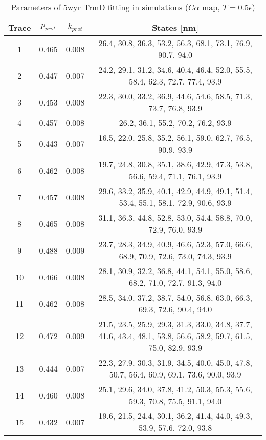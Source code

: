 \begin{table}
    \tiny
    \centering
    \caption{Parameters of 5wyr TrmD fitting in simulations ($C\alpha$ map, $T=0.5\epsilon$)}
    \label{tab:5wyr-ca-parameters}
    \begin{tabular}{c|c|c|c}
        \textbf{Trace} & \textbf{$p_{prot}$} & \textbf{$k_{prot}$} & \textbf{States [nm]}\\\hline
        1 & 0.465 & 0.008 & 26.4, 30.8, 36.3, 53.2, 56.3, 68.1, 73.1, 76.9, 90.7, 94.0\\
        2 & 0.447 & 0.007 & 24.2, 29.1, 31.2, 34.6, 40.4, 46.4, 52.0, 55.5, 58.4, 62.3, 72.7, 77.4, 93.9\\
        3 & 0.453 & 0.008 & 22.3, 30.0, 33.2, 36.9, 44.6, 54.6, 58.5, 71.3, 73.7, 76.8, 93.9\\
        4 & 0.457 & 0.008 & 26.2, 36.1, 55.2, 70.2, 76.2, 93.9\\
        5 & 0.443 & 0.007 & 16.5, 22.0, 25.8, 35.2, 56.1, 59.0, 62.7, 76.5, 90.9, 93.9\\
        6 & 0.462 & 0.008 & 19.7, 24.8, 30.8, 35.1, 38.6, 42.9, 47.3, 53.8, 56.6, 59.4, 71.1, 76.1, 93.9\\
        7 & 0.457 & 0.008 & 29.6, 33.2, 35.9, 40.1, 42.9, 44.9, 49.1, 51.4, 53.4, 55.1, 58.1, 72.9, 90.6, 93.9\\
        8 & 0.465 & 0.008 & 31.1, 36.3, 44.8, 52.8, 53.0, 54.4, 58.8, 70.0, 72.9, 76.0, 93.9\\
        9 & 0.488 & 0.009 & 23.7, 28.3, 34.9, 40.9, 46.6, 52.3, 57.0, 66.6, 68.9, 70.9, 72.6, 73.0, 74.3, 93.9\\
        10 & 0.466 & 0.008 & 28.1, 30.9, 32.2, 36.8, 44.1, 54.1, 55.0, 58.6, 68.2, 71.0, 72.7, 91.3, 94.0\\
        11 & 0.462 & 0.008 & 28.5, 34.0, 37.2, 38.7, 54.0, 56.8, 63.0, 66.3, 69.3, 72.6, 90.4, 94.0\\
        12 & 0.472 & 0.009 & 21.5, 23.5, 25.9, 29.3, 31.3, 33.0, 34.8, 37.7, 41.6, 43.4, 48.1, 53.8, 56.6, 58.2, 59.7, 61.5, 75.0, 82.9, 93.9\\
        13 & 0.444 & 0.007 & 22.3, 27.9, 30.3, 31.9, 34.5, 40.0, 45.0, 47.8, 50.7, 56.4, 60.9, 69.1, 73.6, 90.0, 93.9\\
        14 & 0.460 & 0.008 & 25.1, 29.6, 34.0, 37.8, 41.2, 50.3, 55.3, 55.6, 59.3, 70.8, 75.5, 91.1, 94.0\\
        15 & 0.432 & 0.007 & 19.6, 21.5, 24.4, 30.1, 36.2, 41.4, 44.0, 49.3, 53.9, 57.6, 72.0, 93.8\\
    \end{tabular}
\end{table}

